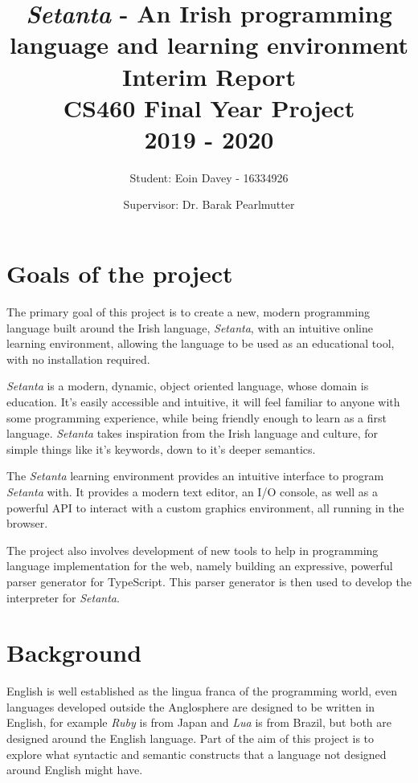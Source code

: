 \documentclass[11pt]{extarticle}
\newcommand{\Setanta}{\emph{Setanta}}
\begin{document}
    \title{
    \huge \Setanta{} - An Irish programming language and learning environment\\
    \Large Interim Report\\
    \large CS460 Final Year Project\\
    2019 - 2020}
    \author{\Large Student: Eoin Davey - 16334926 \and \Large Supervisor: Dr. Barak Pearlmutter}
    \maketitle
    \section{Goals of the project}

        The primary goal of this project is to create a new, modern programming language built around the Irish language, \Setanta{}, with an intuitive online learning environment, allowing the language to be used as an educational tool, with no installation required.

        \Setanta{} is a modern, dynamic, object oriented language, whose domain is education. It's easily accessible and intuitive, it will feel familiar to anyone with some programming experience, while being friendly enough to learn as a first language. \Setanta{} takes inspiration from the Irish language and culture, for simple things like it's keywords, down to it's deeper semantics.

        The \Setanta{} learning environment provides an intuitive interface to program \Setanta{} with. It provides a modern text editor, an I/O console, as well as a powerful API to interact with a custom graphics environment, all running in the browser.

        The project also involves development of new tools to help in programming language implementation for the web, namely building an expressive, powerful parser generator for TypeScript. This parser generator is then used to develop the interpreter for \Setanta{}.

    \section{Background}

        English is well established as the lingua franca of the programming world, even languages developed outside the Anglosphere are designed to be written in English, for example \emph{Ruby} is from Japan and \emph{Lua} is from Brazil, but both are designed around the English language. Part of the aim of this project is to explore what syntactic and semantic constructs that a language not designed around English might have.
\end{document}
